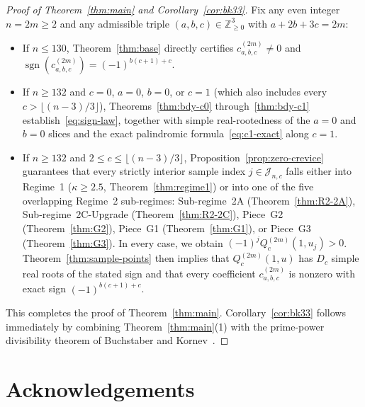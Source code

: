 \documentclass[10pt]{article}
\numberwithin{equation}{section}
\theoremstyle{plain}
\theoremstyle{definition}
\newcommand{\Z}{\mathbb{Z}}
\newcommand{\1}{\mathbf{1}}
\DeclareMathOperator{\sgn}{sgn}
\begin{document}
\begin{proof}[Proof of Theorem~\ref{thm:main} and Corollary~\ref{cor:bk33}]
Fix any even integer $n = 2m \ge 2$ and any admissible triple $(a, b, c) \in \Z_{\ge 0}^3$ with $a + 2b + 3c = 2m$:
\begin{itemize}[leftmargin=1.5em]
    \item If $n \le 130$, Theorem~\ref{thm:base} directly certifies $c_{a,b,c}^{(2m)} \ne 0$ and $\sgn(c_{a,b,c}^{(2m)}) = (-1)^{b(c+1)+c}$.
    \item If $n \ge 132$ and $c = 0$, $a = 0$, $b = 0$, or $c = 1$ (which also includes every $c > \lfloor (n-3)/3 \rfloor$), Theorems~\ref{thm:bdy-c0} through~\ref{thm:bdy-c1} establish~\eqref{eq:sign-law}, together with simple real-rootedness of the $a = 0$ and $b = 0$ slices and the exact palindromic formula~\eqref{eq:c1-exact} along $c = 1$.
    \item If $n \ge 132$ and $2 \le c \le \lfloor (n-3)/3 \rfloor$, Proposition~\ref{prop:zero-crevice} guarantees that every strictly interior sample index $j \in \mathcal{J}_{n,c}$ falls either into Regime~1 ($\kappa \ge 2.5$, Theorem~\ref{thm:regime1}) or into one of the five overlapping Regime~2 sub-regimes: Sub-regime~2A (Theorem~\ref{thm:R2-2A}), Sub-regime~2C-Upgrade (Theorem~\ref{thm:R2-2C}), Piece~G2 (Theorem~\ref{thm:G2}), Piece~G1 (Theorem~\ref{thm:G1}), or Piece~G3 (Theorem~\ref{thm:G3}). In every case, we obtain $(-1)^j Q_c^{(2m)}(1, u_j) > 0$. Theorem~\ref{thm:sample-points} then implies that $Q_c^{(2m)}(1, u)$ has $D_c$ simple real roots of the stated sign and that every coefficient $c_{a,b,c}^{(2m)}$ is nonzero with exact sign $(-1)^{b(c+1)+c}$.
\end{itemize}
This completes the proof of Theorem~\ref{thm:main}. Corollary~\ref{cor:bk33} follows immediately by combining Theorem~\ref{thm:main}(1) with the prime-power divisibility theorem of Buchstaber and Kornev~\cite{BKor2025}.
\end{proof}

\section*{Acknowledgements}
\end{document}
